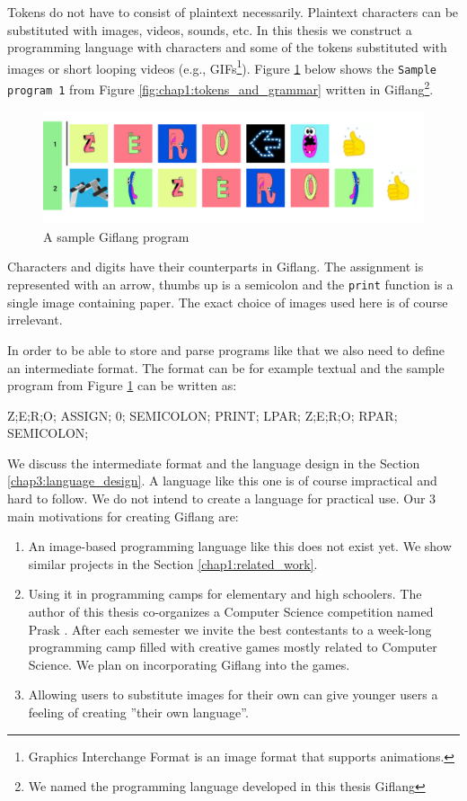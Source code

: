 Tokens do not have to consist of plaintext necessarily. Plaintext characters can be substituted with
images, videos, sounds, etc. In this thesis we construct a programming language with characters and some
of the tokens substituted with images or short looping videos (e.g., GIFs\footnote{Graphics Interchange Format is an image format that supports animations.}).
Figure \ref{fig:chap1:giflang_code} below shows the \texttt{Sample program 1} from Figure \ref{fig:chap1:tokens_and_grammar} written in
Giflang\footnote{We named the programming language developed in this thesis Giflang}.
\begin{figure}[!hbt]
	\includegraphics[width=\textwidth]{../img/giflang_code}
	\caption{A sample Giflang program}
	\label{fig:chap1:giflang_code}
\end{figure}

Characters and digits have their counterparts in Giflang. The assignment is represented with an arrow,
thumbs up is a semicolon and the \texttt{print} function is a single image containing paper. The exact choice of images used here is of course
irrelevant.

In order to be able to store and parse programs like that we also need to define an intermediate
format. The format can be for example textual and the sample program from Figure \ref{fig:chap1:giflang_code} can be written as:
\begin{code}
Z;E;R;O; ASSIGN; 0; SEMICOLON;
PRINT; LPAR; Z;E;R;O; RPAR; SEMICOLON;
\end{code}

We discuss the intermediate format and the language design in the Section \ref{chap3:language_design}. A language like this one is of
course impractical and hard to follow. We do not intend to create a language for practical use. Our $3$ main motivations for
creating Giflang are:
\begin{enumerate}
\item An image-based programming language like this does not exist yet. We show similar projects in the Section \ref{chap1:related_work}. 
\item Using it in programming camps for elementary and high schoolers. The author of this thesis co-organizes a Computer Science competition
named Prask \cite{Prask}. After each semester we invite the best contestants to a week-long programming camp
filled with creative games mostly related to Computer Science. We plan on incorporating Giflang into the games.
\item Allowing users to substitute images for their own can give younger users a feeling of creating ''their own language''.
\end{enumerate}

